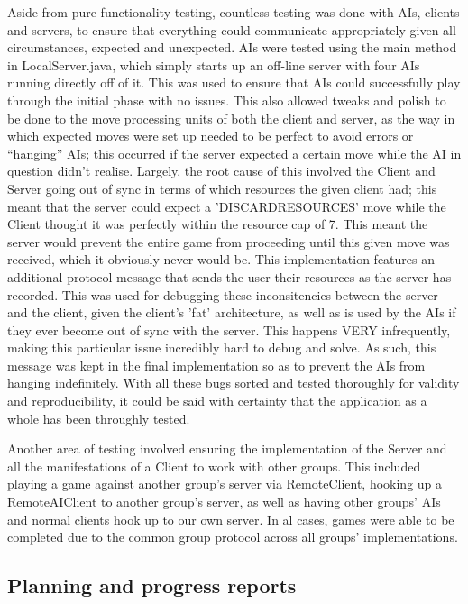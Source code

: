 \documentclass[a4paper,doc]{apa6}
\begin{document}
\begin{appendices}
Aside from pure functionality testing, countless testing was done with AIs, clients and servers, to ensure that everything could communicate appropriately given all circumstances, expected and unexpected. AIs were tested using the main method in LocalServer.java, which simply starts up an off-line server with four AIs running directly off of it. This was used to ensure that AIs could successfully play through the initial phase with no issues. This also allowed tweaks and polish to be done to the move processing units of both the client and server, as the way in which expected moves were set up needed to be perfect to avoid errors or “hanging” AIs; this occurred if the server expected a certain move while the AI in question didn’t realise. Largely, the root cause of this involved the Client and Server going out of sync in terms of which resources the given client had; this meant that the server could expect a 'DISCARDRESOURCES' move while the Client thought it was perfectly within the resource cap of 7. This meant the server would prevent the entire game from proceeding until this given move was received, which it obviously never would be. This implementation features an additional protocol message that sends the user their resources as the server has recorded. This was used for debugging these inconsitencies between the server and the client, given the client's 'fat' architecture, as well as is used by the AIs if they ever become out of sync with the server. This happens VERY infrequently, making this particular issue incredibly hard to debug and solve. As such, this message was kept in the final implementation so as to prevent the AIs from hanging indefinitely. With all these bugs sorted and tested thoroughly for validity and reproducibility, it could be said with certainty that the application as a whole has been throughly tested.

Another area of testing involved ensuring the implementation of the Server and all the manifestations of a Client to work with other groups. This included playing a game against another group's server via RemoteClient, hooking up a RemoteAIClient to another group's server, as well as having other groups' AIs and normal clients hook up to our own server. In al cases, games were able to be completed due to the common group protocol across all groups' implementations.

\subsection{Planning and progress reports}





\end{appendices}

\printbibliography
\end{document}
